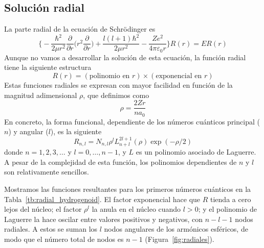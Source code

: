 \documentclass{tufte-handout}
\begin{document}
\subsection{Solución radial}
La parte radial de la ecuación de Schrödinger es
\begin{equation}
    \bigg\{-\frac{\hbar^2}{2\mu r^2}\frac{\partial}{\partial r}\bigg(r^2\frac{\partial}{\partial r}\bigg) 
    +  \frac{l(l+1)\hbar^2}{2\mu r^2}
    - \frac{Ze^2}{4\pi \varepsilon_0r}  \bigg\}
    R(r)
    = ER(r)
\end{equation}
Aunque no vamos a desarrollar la solución de esta ecuación, la función
radial tiene la siguiente estructura
\begin{equation}
    R(r)=(\textrm{polinomio en }r)\times(\textrm{exponencial en }r)
\end{equation}
Estas funciones radiales se expresan con mayor facilidad 
en función de la magnitud adimensional $\rho$, que definimos como
\begin{equation}
    \rho = \frac{2Zr}{na_0}
\end{equation}
En concreto, la forma funcional, dependiente de los números
cuánticos principal ($n$) y angular ($l$), es la siguiente
\begin{equation}
  R_{n,l} = N_{n,l}\rho^l L^{2l+1}_{n+l}(\rho)\exp(-\rho/2)
\end{equation}
donde $n=1,2,3,\ldots$ y $l=0,\ldots,n-1$, y $L$ es un polinomio
asociado de Laguerre. A pesar de la complejidad de esta función,
los polinomios dependientes de $n$ y $l$ son relativamente
sencillos. 

Mostramos las 
funciones resultantes para los primeros números cuánticos en
la Tabla~\ref{tb:radial_hydrogenoid}. El factor exponencial
hace que $R$ tienda a cero lejos del núcleo; el factor $\rho^l$
la anula en el núcleo cuando $l>0$; y el polinomio de Laguerre la
hace oscilar entre valores positivos y negativos, con $n-l-1$
nodos radiales. A estos se suman los
$l$ nodos angulares de los armónicos esféricos, de modo que el
número total de nodos es $n-1$ (Figura~\ref{fig:radiales}). 
\end{document}
